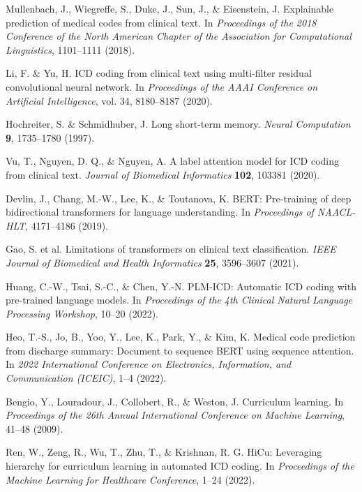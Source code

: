 \documentclass[12pt,a4paper]{report}
\begin{document}
\begin{thebibliography}{99}
Mullenbach, J., Wiegreffe, S., Duke, J., Sun, J., \& Eisenstein, J. Explainable prediction of medical codes from clinical text. In \textit{Proceedings of the 2018 Conference of the North American Chapter of the Association for Computational Linguistics}, 1101–1111 (2018).

Li, F. \& Yu, H. ICD coding from clinical text using multi-filter residual convolutional neural network. In \textit{Proceedings of the AAAI Conference on Artificial Intelligence}, vol. 34, 8180–8187 (2020).

Hochreiter, S. \& Schmidhuber, J. Long short-term memory. \textit{Neural Computation} \textbf{9}, 1735–1780 (1997).

Vu, T., Nguyen, D. Q., \& Nguyen, A. A label attention model for ICD coding from clinical text. \textit{Journal of Biomedical Informatics} \textbf{102}, 103381 (2020).

Devlin, J., Chang, M.-W., Lee, K., \& Toutanova, K. BERT: Pre-training of deep bidirectional transformers for language understanding. In \textit{Proceedings of NAACL-HLT}, 4171–4186 (2019).

Gao, S. et al. Limitations of transformers on clinical text classification. \textit{IEEE Journal of Biomedical and Health Informatics} \textbf{25}, 3596–3607 (2021).

Huang, C.-W., Tsai, S.-C., \& Chen, Y.-N. PLM-ICD: Automatic ICD coding with pre-trained language models. In \textit{Proceedings of the 4th Clinical Natural Language Processing Workshop}, 10–20 (2022).

Heo, T.-S., Jo, B., Yoo, Y., Lee, K., Park, Y., \& Kim, K. Medical code prediction from discharge summary: Document to sequence BERT using sequence attention. In \textit{2022 International Conference on Electronics, Information, and Communication (ICEIC)}, 1–4 (2022).

Bengio, Y., Louradour, J., Collobert, R., \& Weston, J. Curriculum learning. In \textit{Proceedings of the 26th Annual International Conference on Machine Learning}, 41–48 (2009).

Ren, W., Zeng, R., Wu, T., Zhu, T., \& Krishnan, R. G. HiCu: Leveraging hierarchy for curriculum learning in automated ICD coding. In \textit{Proceedings of the Machine Learning for Healthcare Conference}, 1–24 (2022).


\end{thebibliography}
\end{document}
